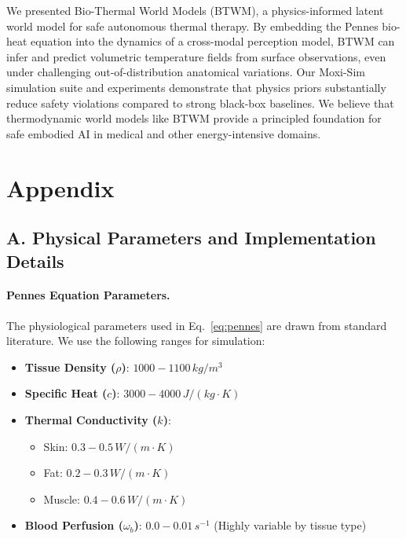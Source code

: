 \documentclass{article}
\begin{document}
We presented Bio-Thermal World Models (BTWM), a physics-informed latent world model for safe autonomous thermal therapy. By embedding the Pennes bio-heat equation into the dynamics of a cross-modal perception model, BTWM can infer and predict volumetric temperature fields from surface observations, even under challenging out-of-distribution anatomical variations. Our Moxi-Sim simulation suite and experiments demonstrate that physics priors substantially reduce safety violations compared to strong black-box baselines. We believe that thermodynamic world models like BTWM provide a principled foundation for safe embodied AI in medical and other energy-intensive domains.







\newpage
\appendix
\section{Appendix}

\subsection{A. Physical Parameters and Implementation Details}

\paragraph{Pennes Equation Parameters.}
The physiological parameters used in Eq.~\ref{eq:pennes} are drawn from standard literature. We use the following ranges for simulation:
\begin{itemize}
    \item \textbf{Tissue Density ($\rho$)}: $1000 - 1100 \, kg/m^3$
    \item \textbf{Specific Heat ($c$)}: $3000 - 4000 \, J/(kg \cdot K)$
    \item \textbf{Thermal Conductivity ($k$)}:
    \begin{itemize}
        \item Skin: $0.3 - 0.5 \, W/(m \cdot K)$
        \item Fat: $0.2 - 0.3 \, W/(m \cdot K)$
        \item Muscle: $0.4 - 0.6 \, W/(m \cdot K)$
    \end{itemize}
    \item \textbf{Blood Perfusion ($\omega_b$)}: $0.0 - 0.01 \, s^{-1}$ (Highly variable by tissue type)
\end{itemize}
\end{document}
